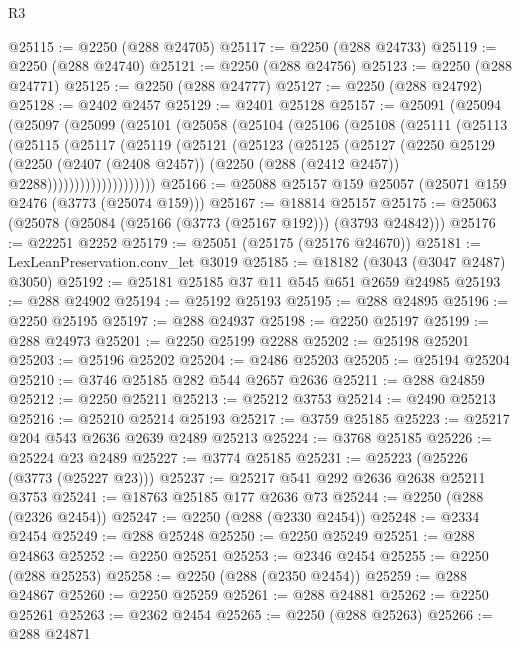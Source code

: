 \begin{lexlean}{R3}
\begin{coremodule}
@25115 := @2250 (@288 @24705)
@25117 := @2250 (@288 @24733)
@25119 := @2250 (@288 @24740)
@25121 := @2250 (@288 @24756)
@25123 := @2250 (@288 @24771)
@25125 := @2250 (@288 @24777)
@25127 := @2250 (@288 @24792)
@25128 := @2402 @2457
@25129 := @2401 @25128
@25157 := @25091
    (@25094
      (@25097
        (@25099
          (@25101
            (@25058
              (@25104
                (@25106
                  (@25108
                    (@25111
                      (@25113
                        (@25115
                          (@25117
                            (@25119
                              (@25121
                                (@25123
                                  (@25125
                                    (@25127
                                      (@2250
                                        @25129
                                        (@2250
                                          (@2407 (@2408 @2457))
                                          (@2250 (@288 (@2412 @2457)) @2288))))))))))))))))))))
@25166 := @25088 @25157 @159 @25057 (@25071 @159 @2476 (@3773 (@25074 @159)))
@25167 := @18814 @25157
@25175 := @25063 (@25078 (@25084 (@25166 (@3773 (@25167 @192))) (@3793 @24842)))
@25176 := @22251 @2252
@25179 := @25051 (@25175 (@25176 @24670))
@25181 := LexLeanPreservation.conv_let @3019
@25185 := @18182 (@3043 (@3047 @2487) @3050)
@25192 := @25181 @25185 @37 @11 @545 @651 @2659 @24985
@25193 := @288 @24902
@25194 := @25192 @25193
@25195 := @288 @24895
@25196 := @2250 @25195
@25197 := @288 @24937
@25198 := @2250 @25197
@25199 := @288 @24973
@25201 := @2250 @25199 @2288
@25202 := @25198 @25201
@25203 := @25196 @25202
@25204 := @2486 @25203
@25205 := @25194 @25204
@25210 := @3746 @25185 @282 @544 @2657 @2636
@25211 := @288 @24859
@25212 := @2250 @25211
@25213 := @25212 @3753
@25214 := @2490 @25213
@25216 := @25210 @25214 @25193
@25217 := @3759 @25185
@25223 := @25217 @204 @543 @2636 @2639 @2489 @25213
@25224 := @3768 @25185
@25226 := @25224 @23 @2489
@25227 := @3774 @25185
@25231 := @25223 (@25226 (@3773 (@25227 @23)))
@25237 := @25217 @541 @292 @2636 @2638 @25211 @3753
@25241 := @18763 @25185 @177 @2636 @73
@25244 := @2250 (@288 (@2326 @2454))
@25247 := @2250 (@288 (@2330 @2454))
@25248 := @2334 @2454
@25249 := @288 @25248
@25250 := @2250 @25249
@25251 := @288 @24863
@25252 := @2250 @25251
@25253 := @2346 @2454
@25255 := @2250 (@288 @25253)
@25258 := @2250 (@288 (@2350 @2454))
@25259 := @288 @24867
@25260 := @2250 @25259
@25261 := @288 @24881
@25262 := @2250 @25261
@25263 := @2362 @2454
@25265 := @2250 (@288 @25263)
@25266 := @288 @24871

\end{coremodule}
\end{lexlean}
